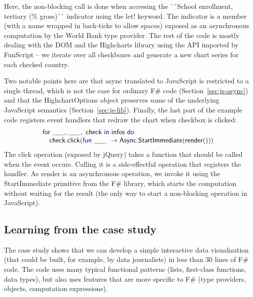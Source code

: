 \documentclass[submission,copyright,creativecommons]{eptcs}
\newcommand{\ignp}{\_\kern-.5ex\_\kern-.5ex\_ }
\newcommand{\kvd}[1]{\textnormal{\textcolor{kvdclr}{\sffamily #1}}}
\newcommand{\ident}[1]{\textnormal{\sffamily #1}}
\newcommand{\lident}[1]{\textnormal{\sffamily 
  \`{}\hspace{-0.25em}\`{}\hspace{-0.1em}#1\`{}\hspace{-0.25em}\`{}}}
\begin{document}
Here, the non-blocking call is done when accessing the \lident{School enrollment, tertiary (\% gross)} 
indicator using the \kvd{let!} keyword. The indicator is a member (with a name wrapped in 
back-ticks to allow spaces) exposed as an asynchronous computation by the World Bank type provider.
The rest of the code is mostly dealing with the DOM and the Highcharts library using the API 
imported by FunScript -- we iterate over all checkboxes and generate a new chart series for each 
checked country. 

Two notable points here are that \ident{async} translated to JavaScript is restricted to a single 
thread, which is not the case for ordinary F\# code (Section~\ref{sec:js-async}) and that the 
\ident{HighchartOptions} object preserves some of the underlying JavaScript semantics 
(Section~\ref{sec:js-lib}). Finally, the last part of the example code registers event handlers that 
redraw the chart when checkbox is clicked:
%
\begin{equation*}
\begin{array}{lll}
 \kvd{for}~\ignp, \ignp,~\ident{check}~\kvd{in}~\ident{infos}~\kvd{do} \\
 \quad \ident{check.click}(\kvd{fun}~\ignp~\rightarrow \ident{Async.StartImmediate}(\ident{render}()))
\end{array}
\end{equation*}
%
The \ident{click} operation (exposed by jQuery) takes a function that should be called when the 
event occurs. Calling it is a side-effectful operation that registers the handler. As \ident{render} 
is an asynchronous operation, we invoke it using the \ident{StartImmediate} primitive from the 
F\# library, which starts the computation without waiting for the result (the only way to start
a non-blocking operation in JavaScript).


\subsection{Learning from the case study}

The case study shows that we can develop a simple interactive data visualization (that could
be built, for example, by data journalists) in less than 30 lines of F\# code. The code uses 
many typical functional patterns (lists, first-class functions, data types), but also uses features
that are more specific to F\# (type providers, objects, computation expressions). 
\end{document}
